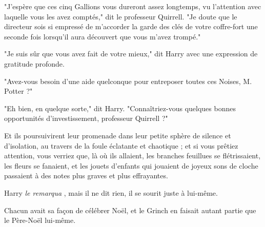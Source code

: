 "J'espère que ces cinq Gallions vous dureront assez longtemps, vu l'attention avec laquelle vous les avez comptés," dit le professeur Quirrell. "Je doute que le directeur sois si empressé de m'accorder la garde des clés de votre coffre-fort une seconde fois lorsqu'il aura découvert que vous m'avez trompé."

"Je suis sûr que vous avez fait de votre mieux," dit Harry avec une expression de gratitude profonde.

"Avez-vous besoin d'une aide quelconque pour entreposer toutes ces Noises, M. Potter ?"

"Eh bien, en quelque sorte," dit Harry. "Connaîtriez-vous quelques bonnes opportunités d'investissement, professeur Quirrell ?"

Et ils poursuivirent leur promenade dans leur petite sphère de silence et d'isolation, au travers de la foule éclatante et chaotique ; et si vous prêtiez attention, vous verriez que, là où ils allaient, les branches feuillues se flétrissaient, les fleurs se fanaient, et les jouets d'enfants qui jouaient de joyeux sons de cloche passaient à des notes plus graves et plus effrayantes.

Harry \emph{le remarqua} , mais il ne dit rien, il se sourit juste à lui-même.

Chacun avait sa façon de célébrer Noël, et le Grinch en faisait autant partie que le Père-Noël lui-même.

